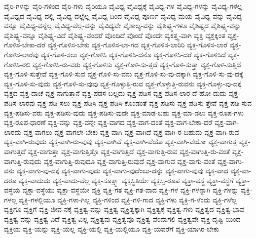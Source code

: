 {ವೈರಿ-ಗಳನ್ನು
ವೈರಿ-ಗಳಿಂದ
ವೈರಿ-ಗಳು
ವೈರಿಯೂ
ವೈವಿಧ್ಯ
ವೈವಿಧ್ಯಕ್ಕೆ
ವೈವಿಧ್ಯ-ಗಳ
ವೈವಿಧ್ಯ-ಗಳನ್ನು
ವೈವಿಧ್ಯ-ಗಳೆಲ್ಲ
ವೈವಿಧ್ಯದ
ವೈವಿಧ್ಯ-ದಲ್ಲಿ
ವೈವಿಧ್ಯ-ದಲ್ಲೆಲ್ಲ
ವೈವಿಧ್ಯ-ದಿಂದ
ವೈವಿಧ್ಯ-ಪೂರ್ಣ
ವೈವಿಧ್ಯ-ಮಯ
ವೈವಿಧ್ಯ-ವನ್ನು
ವೈವಿಧ್ಯ-ವನ್ನೂ
ವೈವಿಧ್ಯ-ವನ್ನೆಲ್ಲ
ವೈವಿಧ್ಯ-ವೆಲ್ಲ-ವನ್ನು
ವೈವಿಧ್ಯವೇ
ವೈಶಾಲ್ಯ-ವನ್ನು
ವೈಶಿಷ್ಟ್ಯ-ಗಳೂ
ವೈಶಿಷ್ಟ್ಯದ
ವೈಶಿಷ್ಟ್ಯ-ವನ್ನು
ವೈಶಿಷ್ಟ್ಯ-ವನ್ನೂ
ವೈಶಿಷ್ಟ್ಯ-ವಿದೆ
ವೈಶಿಷ್ಟ್ಯ-ವೆಂದರೆ
ವೊಂದಿದೆ
ವೊಂದೆ
ವೊಂದೇ
ವ್ಯಕಿತ್ತ್ವ-ವಾಗಿ
ವ್ಯಕ್ತ
ವ್ಯಕ್ತಕ್ಕಿಂತ
ವ್ಯಕ್ತ-ಗೊಳಿಸ-ಬೇಕಾ-ದರೆ
ವ್ಯಕ್ತ-ಗೊಳಿಸ-ಬೇಕು
ವ್ಯಕ್ತ-ಗೊಳಿಸ-ಲಾ-ಗದ
ವ್ಯಕ್ತ-ಗೊಳಿಸ-ಲಾರಿರಿ
ವ್ಯಕ್ತ-ಗೊಳಿಸ-ಲಾರೆ
ವ್ಯಕ್ತ-ಗೊಳಿಸ-ಲಾರೆವು
ವ್ಯಕ್ತ-ಗೊಳಿ-ಸಲು
ವ್ಯಕ್ತ-ಗೊಳಿಸಿ
ವ್ಯಕ್ತ-ಗೊಳಿಸಿ-ದನೊ
ವ್ಯಕ್ತ-ಗೊಳಿಸಿ-ದರೆ
ವ್ಯಕ್ತ-ಗೊಳಿಸಿದೆ
ವ್ಯಕ್ತ-ಗೊಳಿಸಿ-ರಲಿ
ವ್ಯಕ್ತ-ಗೊಳಿಸಿ-ರು-ವರು
ವ್ಯಕ್ತ-ಗೊಳಿಸು
ವ್ಯಕ್ತ-ಗೊಳಿ-ಸು-ತ್ತದೆ
ವ್ಯಕ್ತ-ಗೊಳಿ-ಸುತ್ತಾ
ವ್ಯಕ್ತ-ಗೊಳಿ-ಸುತ್ತಿದೆ
ವ್ಯಕ್ತ-ಗೊಳಿ-ಸುತ್ತೇವೆ
ವ್ಯಕ್ತ-ಗೊಳಿ-ಸುವ
ವ್ಯಕ್ತ-ಗೊಳಿ-ಸು-ವನು
ವ್ಯಕ್ತ-ಗೊಳಿ-ಸು-ವು-ದಕ್ಕಾಗಿ
ವ್ಯಕ್ತ-ಗೊಳಿ-ಸು-ವು-ದಕ್ಕೆ
ವ್ಯಕ್ತ-ಗೊಳಿ-ಸು-ವುದು
ವ್ಯಕ್ತ-ಗೊಳಿ-ಸು-ವುವು
ವ್ಯಕ್ತ-ಗೊಳ್ಳುತ್ತಿ-ರುವ
ವ್ಯಕ್ತ-ಗೊಳ್ಳುತ್ತಿ-ರುವನು
ವ್ಯಕ್ತ-ಗೊಳ್ಳು-ವು-ದಕ್ಕೆ
ವ್ಯಕ್ತದ
ವ್ಯಕ್ತ-ದಾಚೆ
ವ್ಯಕ್ತ-ನಾಗುತ್ತಾನೆ
ವ್ಯಕ್ತ-ಪಡಸ-ಬಲ್ಲದು
ವ್ಯಕ್ತ-ಪಡಿಸ
ವ್ಯಕ್ತ-ಪಡಿಸ-ಲಾರ-ದೆ-ಹೋ-ದುದು
ವ್ಯಕ್ತ-ಪಡಿಸ-ಲಾರವು
ವ್ಯಕ್ತ-ಪಡಿ-ಸಲು
ವ್ಯಕ್ತ-ಪಡಿಸಿ
ವ್ಯಕ್ತ-ಪಡಿಸಿ-ಕೊಂಡಂತೆ
ವ್ಯಕ್ತ-ಪಡಿಸು
ವ್ಯಕ್ತ-ಪಡಿಸು-ತ್ತೇವೆ
ವ್ಯಕ್ತ-ಪಡಿ-ಸುವ
ವ್ಯಕ್ತ-ಪಡಿಸು-ವರು
ವ್ಯಕ್ತ-ಪಡಿಸು-ವುದು
ವ್ಯಕ್ತ-ಪಡಿಸು-ವುದೇ
ವ್ಯಕ್ತ-ಮಾಡ-ಬಹು
ವ್ಯಕ್ತ-ಮಾ-ಡಲು
ವ್ಯಕ್ತ-ರೂಪ-ಗಳು
ವ್ಯಕ್ತ-ರೂಪ-ಧಾರಣೆ
ವ್ಯಕ್ತ-ವನ್ನು
ವ್ಯಕ್ತ-ವನ್ನೇ
ವ್ಯಕ್ತ-ವಾಗದ
ವ್ಯಕ್ತ-ವಾಗ-ದಂತೆ
ವ್ಯಕ್ತ-ವಾಗ-ಬೇಕಾ-ದರೆ
ವ್ಯಕ್ತ-ವಾಗ-ಲಾರದು
ವ್ಯಕ್ತ-ವಾಗಲು
ವ್ಯಕ್ತ-ವಾಗಲೇ-ಬೇಕು
ವ್ಯಕ್ತ-ವಾಗಿ
ವ್ಯಕ್ತ-ವಾಗಿದೆ
ವ್ಯಕ್ತ-ವಾಗಿ-ರ-ಬಹುದು
ವ್ಯಕ್ತ-ವಾಗಿ-ರುವ
ವ್ಯಕ್ತ-ವಾಗಿ-ರುವುದು
ವ್ಯಕ್ತ-ವಾಗಿ-ರು-ವುವು
ವ್ಯಕ್ತ-ವಾಗಿವೆ
ವ್ಯಕ್ತ-ವಾಗಿ-ವೆಯೊ
ವ್ಯಕ್ತ-ವಾಗಿ-ವೆಯೋ
ವ್ಯಕ್ತ-ವಾಗುತ್ತ
ವ್ಯಕ್ತ-ವಾಗುತ್ತದೆ
ವ್ಯಕ್ತ-ವಾಗುತ್ತಾ
ವ್ಯಕ್ತ-ವಾಗುತ್ತಿತ್ತೊ
ವ್ಯಕ್ತ-ವಾಗುತ್ತಿದೆ
ವ್ಯಕ್ತ-ವಾಗುತ್ತಿ-ರುವ
ವ್ಯಕ್ತ-ವಾಗುತ್ತಿ-ರು-ವಂತೆ
ವ್ಯಕ್ತ-ವಾಗುತ್ತಿ-ರುವುದು
ವ್ಯಕ್ತ-ವಾಗುತ್ತಿ-ರುವುದೂ
ವ್ಯಕ್ತ-ವಾಗುತ್ತಿ-ರುವುದೆ
ವ್ಯಕ್ತ-ವಾಗುವ
ವ್ಯಕ್ತ-ವಾಗು-ವಂತೆ
ವ್ಯಕ್ತ-ವಾಗು-ವನು
ವ್ಯಕ್ತ-ವಾಗು-ವು-ದಕ್ಕೆ
ವ್ಯಕ್ತ-ವಾಗು-ವುದು
ವ್ಯಕ್ತ-ವಾಗು-ವುದೆಂಬು-ದನ್ನು
ವ್ಯಕ್ತ-ವಾಗು-ವುವು
ವ್ಯಕ್ತ-ವಾದ
ವ್ಯಕ್ತ-ವಾ-ದರೂ
ವ್ಯಕ್ತ-ವಾದುದು
ವ್ಯಕ್ತ-ವಾದು-ವೆಲ್ಲ
ವ್ಯಕ್ತ-ಸೂಕ್ಷ್ಮಾ
ವ್ಯಕ್ತಸ್ಥಿತಿಯೇ
ವ್ಯಕ್ತಸ್ವ-ರೂಪ
ವ್ಯಕ್ತಾ-ವಸ್ಥೆ
ವ್ಯಕ್ತಾ-ವಸ್ಥೆಗೆ
ವ್ಯಕ್ತಾ-ವಸ್ಥೆಯ
ವ್ಯಕ್ತಾ-ವಸ್ಥೆಯು
ವ್ಯಕ್ತಾ-ವಸ್ಥೆಯೇ
ವ್ಯಕ್ತಿ
ವ್ಯಕ್ತಿ-ಗತ
ವ್ಯಕ್ತಿ-ಗತ-ವಾದ
ವ್ಯಕ್ತಿ-ಗಳ
ವ್ಯಕ್ತಿ-ಗಳನ್ನಾಗಿ
ವ್ಯಕ್ತಿ-ಗಳನ್ನು
ವ್ಯಕ್ತಿ-ಗಳಲ್ಲ
ವ್ಯಕ್ತಿ-ಗಳಲ್ಲಿಯೂ
ವ್ಯಕ್ತಿ-ಗಳಾ-ಗಿಲ್ಲ
ವ್ಯಕ್ತಿ-ಗಳಿಂದ
ವ್ಯಕ್ತಿ-ಗಳಿ-ಗಾದ
ವ್ಯಕ್ತಿ-ಗಳು
ವ್ಯಕ್ತಿ-ಗ-ಳೆಂದು
ವ್ಯಕ್ತಿ-ಗಳೆಲ್ಲ
ವ್ಯಕ್ತಿಗೂ
ವ್ಯಕ್ತಿಗೆ
ವ್ಯಕ್ತಿ-ಜೀವ-ನಕ್ಕೆ
ವ್ಯಕ್ತಿತ್ವ-ವನ್ನು
ವ್ಯಕ್ತಿತ್ವ
ವ್ಯಕ್ತಿತ್ವಕ್ಕಾಗಿ
ವ್ಯಕ್ತಿತ್ವಕ್ಕೆ
ವ್ಯಕ್ತಿತ್ವ-ಗಳು
ವ್ಯಕ್ತಿತ್ವದ
ವ್ಯಕ್ತಿತ್ವ-ಭಾವ
ವ್ಯಕ್ತಿತ್ವ-ವನ್ನು
ವ್ಯಕ್ತಿತ್ವ-ವಿದೆ
ವ್ಯಕ್ತಿತ್ವ-ವಿಲ್ಲ
ವ್ಯಕ್ತಿತ್ವವು
ವ್ಯಕ್ತಿತ್ವವೂ
ವ್ಯಕ್ತಿತ್ವ-ವೆಂದಾಗಲಿ
ವ್ಯಕ್ತಿತ್ವವೇ
ವ್ಯಕ್ತಿ-ದೃಷ್ಟಿ-ಯಿಂದ
ವ್ಯಕ್ತಿಯ
ವ್ಯಕ್ತಿ-ಯನ್ನು
ವ್ಯಕ್ತಿ-ಯಲ್ಲ
ವ್ಯಕ್ತಿ-ಯಲ್ಲಿ
ವ್ಯಕ್ತಿ-ಯಲ್ಲಿಯೂ
ವ್ಯಕ್ತಿ-ಯವರೆಗೆ
ವ್ಯಕ್ತಿ-ಯಾಗಿರ-ಬೇಕು
}

